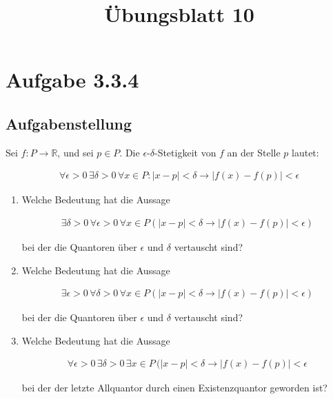 \documentclass[a4paper]{article}
\title{Übungsblatt 10}
\date{}
\author{}
\newcommand*{\R}{\mathbb R}
\begin{document}
\maketitle

\section{Aufgabe 3.3.4}

\subsection{Aufgabenstellung}

Sei $f:P\to\R$, und sei $p\in P$. Die $\epsilon$-$\delta$-Stetigkeit von $f$ an der Stelle $p$ lautet:

\begin{align}
  \forall \epsilon > 0\, \exists \delta > 0\, \forall x \in P: |x-p|<\delta \to |f(x)-f(p)|<\epsilon
\end{align}

\begin{enumerate}
  \item Welche Bedeutung hat die Aussage

    \begin{align}
      \exists \delta > 0\,\forall \epsilon > 0\,\forall x \in P (|x-p|<\delta \to |f(x)-f(p)|<\epsilon)
    \end{align}

    bei der die Quantoren über $\epsilon$ und $\delta$ vertauscht sind?

  \item Welche Bedeutung hat die Aussage

    \begin{align}
      \exists \epsilon > 0\,\forall \delta > 0\,\forall x\in P(|x-p|<\delta\to|f(x)-f(p)|<\epsilon)
    \end{align}

      bei der die Quantoren über $\epsilon$ und $\delta$ vertauscht sind?

    \item Welche Bedeutung hat die Aussage

      \begin{align}
        \forall \epsilon > 0\,\exists \delta > 0\,\exists x\in P\,(|x-p|<\delta \to |f(x)-f(p)|<\epsilon
      \end{align}

      bei der der letzte Allquantor durch einen Existenzquantor geworden ist?
\end{enumerate}
\end{document}
